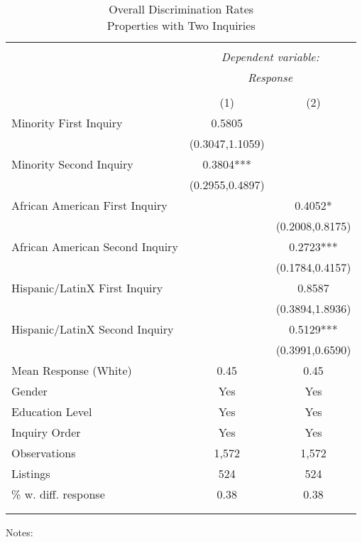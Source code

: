  \begin{table}[H] \footnotesize \centering \begin{threeparttable} \captionsetup{justification=centering}   \caption{Overall Discrimination Rates \\   Properties with Two Inquiries}   \label{tab:probhighexposuretwoinquiries}  \begin{tabular}{@{\extracolsep{5pt}} lcc}  \\[-1.8ex]\hline  \hline \\[-1.8ex]  & \multicolumn{2}{c}{\it Dependent variable:} \\ & \multicolumn{2}{c}{\it  Response} \\ \cline{2-3}\\ [-1.8ex]  &(1)              & (2)                   \\        
\hline
Minority First Inquiry&      0.5805   &               \\
                    &(0.3047,1.1059)   &               \\
Minority Second Inquiry&      0.3804***&               \\
                    &(0.2955,0.4897)   &               \\
African American First Inquiry&               &      0.4052*  \\
                    &               &(0.2008,0.8175)   \\
African American Second Inquiry&               &      0.2723***\\
                    &               &(0.1784,0.4157)   \\
Hispanic/LatinX First Inquiry&               &      0.8587   \\
                    &               &(0.3894,1.8936)   \\
Hispanic/LatinX Second Inquiry&               &      0.5129***\\
                    &               &(0.3991,0.6590)   \\
\hline
 Mean Response (White)&        0.45   &        0.45   \\
\hline Gender       &         Yes   &         Yes   \\
Education Level     &         Yes   &         Yes   \\
Inquiry Order       &         Yes   &         Yes   \\
\hline Observations &       1,572   &       1,572   \\
Listings            &         524   &         524   \\
\% w. diff. response&        0.38   &        0.38   \\
 \\[-1.8ex]\hline  \hline \\[-1.8ex]  \end{tabular}  \begin{tablenotes} \scriptsize \item Notes:  \end{tablenotes} \end{threeparttable} \end{table}        
